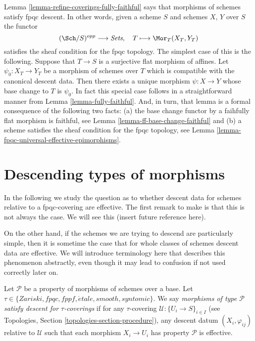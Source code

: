 \begin{remark}
\label{remark-morphisms-of-schemes-satisfy-fpqc-descent}
Lemma \ref{lemma-refine-coverings-fully-faithful}
says that morphisms of schemes satisfy fpqc descent.
In other words, given a scheme $S$ and schemes $X$, $Y$ over $S$
the functor
$$
(\Sch/S)^{opp} \longrightarrow \textit{Sets},
\quad
T \longmapsto \Mor_T(X_T, Y_T)
$$
satisfies the sheaf condition for the fpqc topology.
The simplest case of this is the following. Suppose that $T \to S$
is a surjective flat morphism of affines. Let $\psi_0 : X_T \to Y_T$
be a morphism of schemes over $T$ which is compatible with the
canonical descent data. Then there exists a unique morphism
$\psi : X \to Y$ whose base change to $T$ is $\psi_0$. In fact this
special case follows in a straightforward manner from
Lemma \ref{lemma-fully-faithful}.
And, in turn, that lemma is a formal consequence of the following
two facts:
(a) the base change functor by a faihfully flat morphism is faithful, see
Lemma \ref{lemma-ff-base-change-faithful}
and (b) a scheme satisfies the sheaf condition for the fpqc topology, see
Lemma \ref{lemma-fpqc-universal-effective-epimorphisms}.
\end{remark}







\section{Descending types of morphisms}
\label{section-descending-types-morphisms}

\noindent
In the following we study the question as to whether
descent data for schemes relative to a fpqc-covering
are effective. The first remark to make is that this
is not always the case. We will see this (insert
future reference here).

\medskip\noindent
On the other hand, if the schemes we are trying to
descend are particularly simple, then it is sometime the
case that for whole classes of schemes descent data
are effective. We will introduce terminology here that
describes this phenomenon abstractly, even though it
may lead to confusion if not used correctly later on.

\begin{definition}
\label{definition-descending-types-morphisms}
Let $\mathcal{P}$ be a property of morphisms of schemes over a base.
Let $\tau \in \{Zariski, fpqc, fppf, \acute{e}tale, smooth, syntomic\}$.
We say
{\it morphisms of type $\mathcal{P}$ satisfy descent for $\tau$-coverings}
if for
any $\tau$-covering $\mathcal{U} : \{U_i \to S\}_{i \in I}$
(see Topologies, Section \ref{topologies-section-procedure}),
any descent datum $(X_i, \varphi_{ij})$ relative to $\mathcal{U}$
such that each morphism $X_i \to U_i$ has property $\mathcal{P}$
is effective.
\end{definition}

